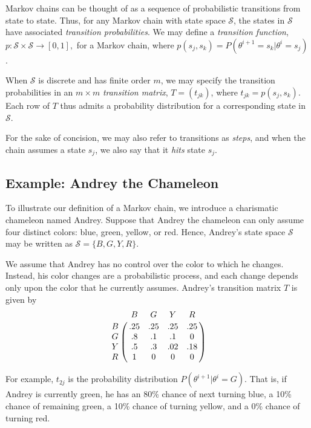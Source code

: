 \documentclass[12pt,twoside]{reedthesis}
\begin{document}
			Markov chains can be thought of as a sequence of probabilistic transitions from state to state.
			Thus, for any Markov chain with state space $\mathcal S$, 
			the states in $\mathcal S$ have associated {\em transition probabilities}.
			We may define a {\em transition function}, $p: \mathcal{S}\times\mathcal{S} \rightarrow [0,1],$ for a Markov chain, where $p(s_j,s_k) = P(\theta^{i+1} = s_k | \theta^{i} = s_j)$. 
			
			When $\mathcal S$ is discrete and has finite order $m$, we may specify the transition probabilities in an $m \times m$ {\em transition matrix}, $T = (t_{jk})$, where $t_{jk} = p(s_j,s_k)$. Each row of $T$ thus admits a probability distribution for a corresponding state in $\mathcal S$. 
			
			For the sake of concision, we may also refer to transitions as {\em steps}, and when the chain assumes a state $s_j$, we also say that it {\em hits} state $s_j$. 
			
	 
	\subsection*{Example: Andrey the Chameleon}
	To illustrate our definition of a Markov chain, we introduce a charismatic chameleon named Andrey. 
	Suppose that Andrey the chameleon can only assume four distinct colors: blue, green, yellow, or red. Hence, Andrey's state space $\mathcal S$ may be written as $\mathcal{S} = \{B, G, Y, R\}$. 
	
	We assume that Andrey has no control over the color to which he changes. Instead, his color changes are a probabilistic process, and each change depends only upon the color that he currently assumes. Andrey's transition matrix $T$ is given by
$$
\bordermatrix{ ~ & B & G & Y & R \cr
	                     B & .25 & .25 & .25 & .25 \cr
	                     G & .8 & .1 & .1 & 0 \cr
	                     Y & .5 & .3 & .02 & .18 \cr
	                     R & 1 & 0 & 0 & 0 \cr	                     	                     	                     
}
$$
	
	For example, $t_{2j}$ is the probability distribution $P(\theta^{i+1} | \theta^i = G)$. That is, if Andrey is currently green, he has an 80\% chance of next turning blue, a 10\% chance of remaining green, a 10\% chance of turning yellow, and a 0\% chance of turning red. 
	
\end{document}
